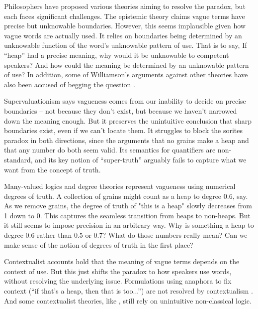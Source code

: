 \documentclass[man,floatsintext]{apa7}
\begin{document}
Philosophers have proposed various theories aiming to resolve the paradox, but each faces significant challenges. The epistemic theory \autocite{sorensenBlindspots1988,williamsonKnowledgeItsLimits2000} claims vague terms have precise but unknowable boundaries. However, this seems implausible given how vague words are actually used. It relies on boundaries being determined by an unknowable function of the word's unknowable pattern of use. That is to say, If ``heap'' had a precise meaning, why would it be unknowable to competent speakers? And how could the meaning be determined by an unknowable pattern of use? In addition, some of Williamson's arguments against other theories have also been accused of begging the question \autocite{wrightEpistemicConceptionVagueness2021}.

Supervaluationism \autocite{fineVaguenessTruthLogic1975,keefeTheoriesVagueness2000} says vagueness comes from our inability to decide on precise boundaries -- not because they don't exist, but because we haven't narrowed down the meaning enough. But it preserves the unintuitive conclusion that sharp boundaries exist, even if we can't locate them. It struggles to block the sorites paradox in both directions, since the arguments that no grains make a heap and that any number do both seem valid. Its semantics for quantifiers are non-standard, and its key notion of ``super-truth'' arguably fails to capture what we want from the concept of truth.

Many-valued logics and degree theories \autocite{goguenLogicInexactConcepts1969,zadehFuzzyLogicApproximate1975,smithVaguenessDegreesTruth2008} represent vagueness using numerical degrees of truth. A collection of grains might count as a heap to degree 0.6, say. As we remove grains, the degree of truth of "this is a heap" slowly decreases from 1 down to 0. This captures the seamless transition from heaps to non-heaps. But it still seems to impose precision in an arbitrary way. Why is something a heap to degree 0.6 rather than 0.5 or 0.7? What do those numbers really mean? Can we make sense of the notion of degrees of truth in the first place?

Contextualist accounts \autocite{kampParadoxHeap1981,soamesUnderstandingTruth1999} hold that the meaning of vague terms depends on the context of use. But this just shifts the paradox to how speakers use words, without resolving the underlying issue. Formulations using anaphora to fix context (``if that's a heap, then that is too...'') are not resolved by contextualism \autocite{stanleyContextInterestRelativity2003}. And some contextualist theories, like \textcite{shapiroVaguenessContext2006}, still rely on unintuitive non-classical logic.
\end{document}
